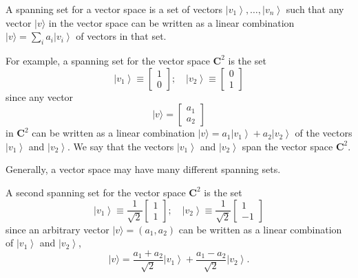 A spanning set for a vector space is a set of vectors $\left|v_{1}\right\rangle, \ldots,\left|v_{n}\right\rangle$ such that any vector $|v\rangle$ in the vector space can be written as a linear combination $|v\rangle=\sum_{i} a_{i}\left|v_{i}\right\rangle$ of vectors in that set. 

\begin{example}
    For example, a spanning set for the vector space $\mathbf{C}^{2}$ is the set
    \begin{equation}
    \left|v_{1}\right\rangle \equiv\left[\begin{array}{l}
    1 \\
    0
    \end{array}\right] ; \quad\left|v_{2}\right\rangle  \equiv\left[\begin{array}{l}
    0 \\
    1
    \end{array}\right]
\end{equation}
    since any vector
    \begin{equation}
    |v\rangle=\left[\begin{array}{l}
    a_{1} \\
    a_{2}
    \end{array}\right]
\end{equation}
    in $\mathbf{C}^{2}$ can be written as a linear combination $|v\rangle=a_{1}\left|v_{1}\right\rangle+a_{2}\left|v_{2}\right\rangle$ of the vectors $\left|v_{1}\right\rangle$ and $\left|v_{2}\right\rangle$. We say that the vectors $\left|v_{1}\right\rangle$ and $\left|v_{2}\right\rangle$ span the vector space $\mathbf{C}^{2}$.
\end{example}

Generally, a vector space may have many different spanning sets. 

\begin{example}
A second spanning set for the vector space $\mathbf{C}^{2}$ is the set
\begin{equation}
    \left|v_{1}\right\rangle \equiv \frac{1}{\sqrt{2}}\left[\begin{array}{l}
1 \\
1
\end{array}\right] ; \quad\left|v_{2}\right\rangle \equiv \frac{1}{\sqrt{2}}\left[\begin{array}{r}
1 \\
-1
\end{array}\right]
\end{equation}
since an arbitrary vector $|v\rangle=\left(a_{1}, a_{2}\right)$ can be written as a linear combination of $\left|v_{1}\right\rangle$ and $\left|v_{2}\right\rangle$,
\begin{equation}
    |v\rangle=\frac{a_{1}+a_{2}}{\sqrt{2}}\left|v_{1}\right\rangle+\frac{a_{1}-a_{2}}{\sqrt{2}}\left|v_{2}\right\rangle.
\end{equation}
\end{example}

